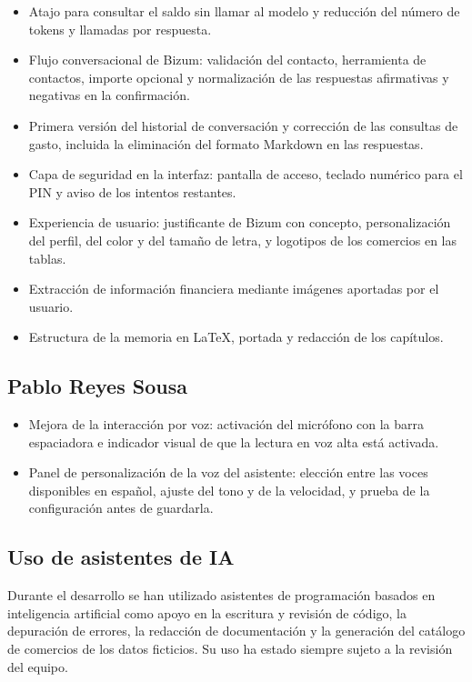 \begin{itemize}
    \item Atajo para consultar el saldo sin llamar al modelo y reducción del
    número de tokens y llamadas por respuesta.
    \item Flujo conversacional de Bizum: validación del contacto, herramienta de
    contactos, importe opcional y normalización de las respuestas afirmativas y
    negativas en la confirmación.
    \item Primera versión del historial de conversación y corrección de las
    consultas de gasto, incluida la eliminación del formato Markdown en las
    respuestas.
    \item Capa de seguridad en la interfaz: pantalla de acceso, teclado numérico
    para el PIN y aviso de los intentos restantes.
    \item Experiencia de usuario: justificante de Bizum con concepto,
    personalización del perfil, del color y del tamaño de letra, y logotipos de
    los comercios en las tablas.
    \item Extracción de información financiera mediante imágenes aportadas por el usuario.
    \item Estructura de la memoria en \LaTeX{}, portada y redacción de los
    capítulos.
    
\end{itemize}

\subsection{Pablo Reyes Sousa}

\begin{itemize}
    \item Mejora de la interacción por voz: activación del micrófono con la
    barra espaciadora e indicador visual de que la lectura en voz alta está
    activada.
    \item Panel de personalización de la voz del asistente: elección entre las
    voces disponibles en español, ajuste del tono y de la velocidad, y prueba de
    la configuración antes de guardarla.
\end{itemize}

\subsection{Uso de asistentes de IA}

Durante el desarrollo se han utilizado asistentes de programación basados en
inteligencia artificial como apoyo en la escritura y revisión de código, la
depuración de errores, la redacción de documentación y la generación del
catálogo de comercios de los datos ficticios. Su uso ha estado siempre sujeto a la revisión del equipo.
